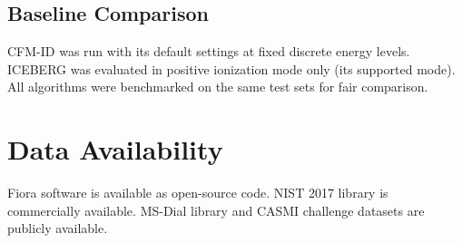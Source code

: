 \documentclass[11pt]{article}
\begin{document}
\subsection{Baseline Comparison}

CFM-ID was run with its default settings at fixed discrete energy levels. ICEBERG was evaluated in positive ionization mode only (its supported mode). All algorithms were benchmarked on the same test sets for fair comparison.

\section*{Data Availability}
Fiora software is available as open-source code. NIST 2017 library is commercially available. MS-Dial library and CASMI challenge datasets are publicly available.



\end{document}
